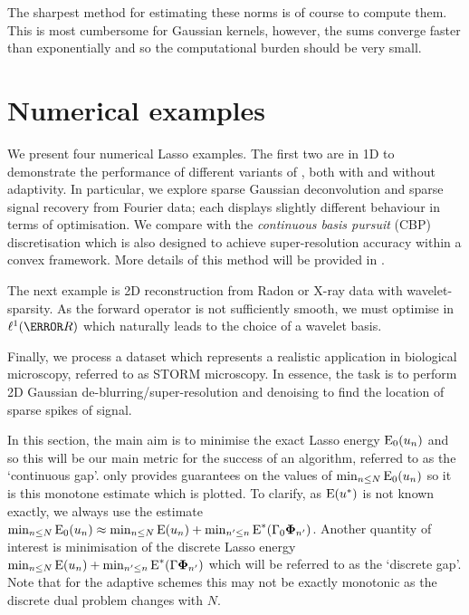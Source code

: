\documentclass[10pt,a4paper,onecolumn]{article}
\numberwithin{equation}{section}
\newcommand{\op}[1]{\operatorname{#1}}\newcommand{\overtext}[2]{\stackrel{\text{#1}}{#2}}
\renewcommand{\vec}{\mathbf}
\newcommand*{\Func}[1]{%
	\IfEqCase{#1}{%
		{0}{\op{E}}%
		{1}{\op{F}}%
		{2}{\op{G}}%
		{3}{\op{H}}%
	}[\op{F}#1]%
}
\newcommand*{\varf}[1]{%
	\IfEqCase{#1}{%
		{0}{u}%
		{1}{v}%
		{2}{w}%
	}[u#1]%
}
\newcommand*{\vard}[1]{%
	\IfEqCase{#1}{%
		{0}{\varphi}%
		{1}{\psi}%
	}[\varphi #1]%
}
\newcommand*{\vars}[1]{%
	\IfEqCase{#1}{%
		{0}{\alpha}%
		{1}{\beta}%
		{2}{\gamma}%
		{3}{a}%
		{4}{b}%
		{5}{c}%
	}[k#1]%
}
\newcommand*{\data}[1]{%
	\IfEqCase{#1}{%
		{0}{\eta}%
		{1}{\nu}%
	}[g]%
}
\newcommand*{\vvard}[1]{\vec{\vard{#1}}}\newcommand*{\vdata}[1]{\vec{\data{#1}}}
\begin{document}
The sharpest method for estimating these norms is of course to compute them. This is most cumbersome for Gaussian kernels, however, the sums converge faster than exponentially and so the computational burden should be very small.


\section{Numerical examples}\label{sec: numerics}
We present four numerical Lasso examples. The first two are in 1D to demonstrate the performance of different variants of , both with and without adaptivity. In particular, we explore sparse Gaussian deconvolution and sparse signal recovery from Fourier data; each displays slightly different behaviour in terms of optimisation. We compare with the \emph{continuous basis pursuit} (CBP) discretisation \citep{Ekanadham2011, Duval2017b} which is also designed to achieve super-resolution accuracy within a convex framework. More details of this method will be provided in .

The next example is 2D reconstruction from Radon or X-ray data with wavelet-sparsity. As the forward operator is not sufficiently smooth, we must optimise in $\ell^1(\R)$ which naturally leads to the choice of a wavelet basis. 

Finally, we process a dataset which represents a realistic application in biological microscopy, referred to as STORM microscopy. In essence, the task is to perform 2D Gaussian de-blurring/super-resolution and denoising to find the location of sparse spikes of signal.

In this section, the main aim is to minimise the exact Lasso energy $\Func0_0(\varf0_n)$ and so this will be our main metric for the success of an algorithm, referred to as the `continuous gap'.  only provides guarantees on the values of $\min_{n\leq N}\Func0_0(\varf0_n)$ so it is this monotone estimate which is plotted. To clarify, as $\Func0(\varf0^*)$ is not known exactly, we always use the estimate $\min_{n\leq N}\Func0_0(\varf0_n) \approx \min_{n\leq N}\Func0(\varf0_n) + \min_{n'\leq n}\Func0^*(\vars2_0\vvard0_{n'})$. Another quantity of interest is minimisation of the discrete Lasso energy $\min_{n\leq N}\Func0(\varf0_n) + \min_{n'\leq n}\Func0^*(\vars2\vvard0_{n'})$ which will be referred to as the `discrete gap'. Note that for the adaptive schemes this may not be exactly monotonic as the discrete dual problem changes with $N$.
\end{document}
